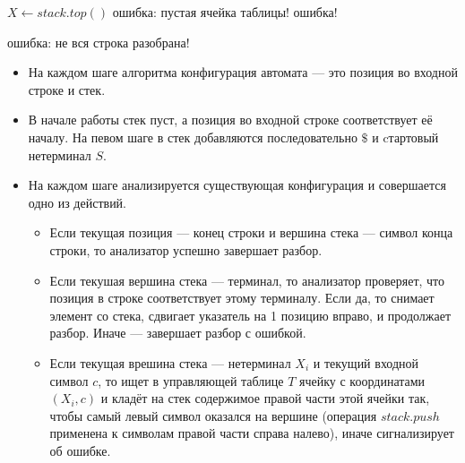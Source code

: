 \documentclass[10pt]{article}         %
\begin{document}
	\begin{algorithm}
		\begin{algorithmic}
			
			\State $X \gets stack.top()$
			\Else
			\State ошибка: пустая ячейка таблицы!
			\EndIf
			\State ошибка!
			\EndIf
			\EndWhile
			
			\State ошибка: не вся строка разобрана!
			\EndIf		
		\end{algorithmic}
		
	\end{algorithm}
	\begin{itemize}
		
	\item На каждом шаге алгоритма конфигурация автомата --- это позиция во входной строке и стек.
	\item В начале работы стек пуст, а позиция во входной строке соответствует её началу.
	На певом шаге в стек добавляются последовательно $\$$ и cтартовый нетерминал $S$.
	\item На каждом шаге анализируется существующая конфигурация и совершается одно из действий.
	\begin{itemize}
		\item Если текущая позиция --- конец строки и вершина стека --- символ конца строки, то анализатор успешно завершает разбор.
		\item Если текушая вершина стека --- терминал, то анализатор проверяет, что позиция в строке соответствует этому терминалу. Если да, то снимает элемент со стека, сдвигает указатель на 1 позицию вправо, и продолжает разбор.
		Иначе --- завершает разбор с ошибкой.
		\item Если текущая врешина стека --- нетерминал $X_i$ и текущий входной символ $c$, то ищет в управляющей таблице $T$ ячейку с координатами $(X_i, c)$ и кладёт на стек содержимое правой части этой ячейки так, чтобы самый левый символ оказался на вершине (операция $stack.push$ применена к символам правой части справа налево), иначе сигнализирует об ошибке.
	\end{itemize}
	\end{itemize}
	
\end{document}
